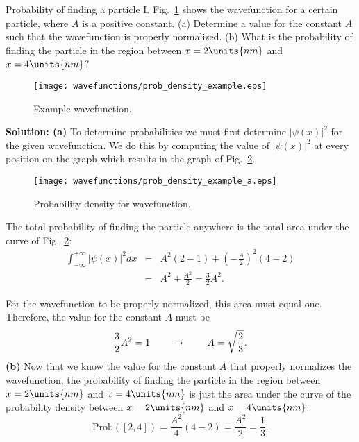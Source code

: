 \begin{example}{Probability of finding a particle I.}
Fig.~\ref{fig:example_wavefunction} shows the wavefunction for a
certain particle, where $A$ is a positive constant. (a) Determine a
value for the constant $A$ such that the wavefunction is properly
normalized. (b) What is the probability of finding the particle in the
region between $x = 2\units{nm}$ and $x = 4\units{nm}$?

\begin{figure}[!hb]
\begin{center}
\texttt{[image: wavefunctions/prob\_density\_example.eps]}
\end{center}
\caption{Example wavefunction.}
\label{fig:example_wavefunction}
\end{figure}

{\bf Solution: (a)} To determine probabilities we must first determine
$|\psi(x)|^2$ for the given wavefunction. We do this by computing the
value of $|\psi(x)|^2$ at every position on the graph which results in
the graph of Fig.~\ref{fig:example_prob_density}.

\begin{figure}[!hb]
\begin{center}
\texttt{[image: wavefunctions/prob\_density\_example\_a.eps]}
\end{center}
\caption{Probability density for wavefunction.}
\label{fig:example_prob_density}
\end{figure}
The total probability of finding the particle anywhere is the total
area under the curve of Fig.~\ref{fig:example_prob_density}:
\begin{eqnarray} 
\int_{-\infty}^{+\infty} |\psi(x)|^2 dx &=& A^2 (2 - 1) + \left( - \frac{A}{2} \right)^2 (4 - 2) \nonumber \\
&=& A^2 + \frac{A^2}{2} = \frac{3}{2} A^2 .
\end{eqnarray}

For the wavefunction to be properly normalized, this area must equal
one.  Therefore, the value for the constant $A$ must be
\begin{equation}
\frac{3}{2} A^2 = 1 \hspace{0.3in} \rightarrow \hspace{0.3in} A = \sqrt{\frac{2}{3}}.
\end{equation}
{\bf (b)} Now that we know the value for the constant $A$ that
properly normalizes the wavefunction, the probability of finding the
particle in the region between $x = 2\units{nm}$ and $x = 4\units{nm}$ is just the area
under the curve of the probability density between $x = 2\units{nm}$ and $x =
4\units{nm}$:
\begin{equation}
\text{Prob}([2, 4]) = \frac{A^2}{4} (4 - 2) = \frac{A^2}{2} = \frac{1}{3}. 
\end{equation}
\end{example}

